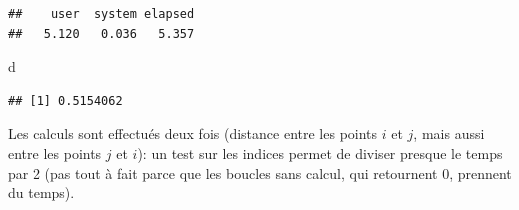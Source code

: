 \documentclass[
  12pt,
  french,
  a4paper,
  extrafontsizes,onecolumn,openright
  ]{memoir}
\newenvironment{Shaded}{\begin{snugshade}}{\end{snugshade}}
\newcommand{\ControlFlowTok}[1]{\textcolor[rgb]{0.13,0.29,0.53}{\textbf{#1}}}
\newcommand{\DecValTok}[1]{\textcolor[rgb]{0.00,0.00,0.81}{#1}}
\newcommand{\KeywordTok}[1]{\textcolor[rgb]{0.13,0.29,0.53}{\textbf{#1}}}
\newcommand{\NormalTok}[1]{#1}
\newcommand{\OperatorTok}[1]{\textcolor[rgb]{0.81,0.36,0.00}{\textbf{#1}}}
\newcommand{\StringTok}[1]{\textcolor[rgb]{0.31,0.60,0.02}{#1}}
\begin{document}
\begin{verbatim}
##    user  system elapsed 
##   5.120   0.036   5.357
\end{verbatim}

\begin{Shaded}
\begin{Highlighting}[]
\NormalTok{d}
\end{Highlighting}
\end{Shaded}

\begin{verbatim}
## [1] 0.5154062
\end{verbatim}

\normalsize

Les calculs sont effectués deux fois (distance entre les points \(i\) et \(j\), mais aussi entre les points \(j\) et \(i\)): un test sur les indices permet de diviser presque le temps par 2 (pas tout à fait parce que les boucles sans calcul, qui retournent \(0\), prennent du temps).

\scriptsize

\begin{Shaded}
\end{Shaded}
\end{document}
